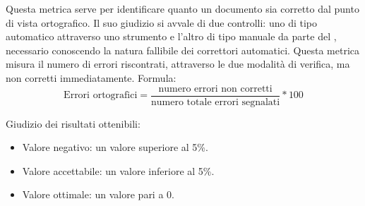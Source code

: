 \documentclass[a4paper, titlepage]{article}
\begin{document}
\label{par:errort}
Questa metrica serve per identificare quanto un documento sia corretto dal punto di vista ortografico. Il suo giudizio si avvale di due controlli: uno di tipo automatico attraverso uno strumento  e l'altro di tipo manuale da parte del , necessario conoscendo la natura fallibile dei correttori automatici.
\newline Questa metrica misura il numero di errori riscontrati, attraverso le due modalità di verifica, ma non corretti immediatamente.
\newline Formula:
\begin{displaymath}
\mbox{Errori ortografici}= \frac{\mbox{numero errori non corretti}}{\mbox{numero totale errori segnalati}}*100
\end{displaymath}
\par Giudizio dei risultati ottenibili:
\begin{itemize}
\item Valore negativo: un valore superiore al 5\%. 
\item Valore accettabile: un valore inferiore al 5\%.
\item Valore ottimale: un valore pari a 0.
\end{itemize}
\end{document}
